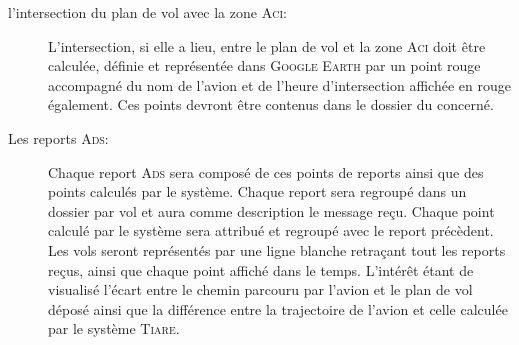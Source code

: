 \begin{description}
    \item[l'intersection du plan de vol avec la zone \textsc{Aci}:] L'intersection, si elle a lieu, entre le plan de vol et la zone \textsc{Aci} doit être calculée, définie et représentée dans \textsc{Google Earth} par un point rouge accompagné du nom de l'avion et de l'heure d'intersection affichée en rouge également. Ces points devront être contenus dans le dossier du concerné.

    \item[Les reports \textsc{Ads}:] Chaque report \textsc{Ads} sera composé de ces points de reports ainsi que des points calculés par le système. Chaque report sera regroupé dans un dossier par vol et aura comme description le message reçu. Chaque point calculé par le système sera attribué et regroupé avec le report précèdent. Les vols seront représentés par une ligne blanche retraçant tout les reports reçus, ainsi que chaque point affiché dans le temps. L'intérêt étant de visualisé l'écart entre le chemin parcouru par l'avion et le plan de vol déposé ainsi que la différence entre la trajectoire de l'avion et celle calculée par le système \textsc{Tiare}. 
\end{description}
















